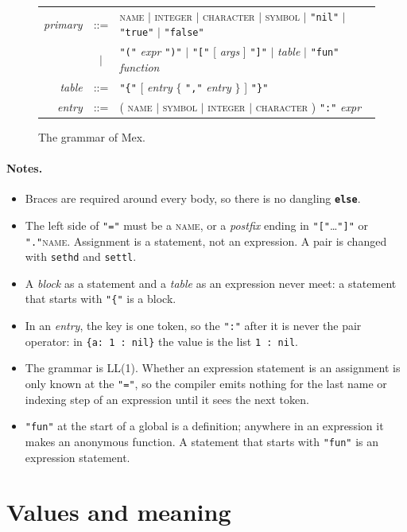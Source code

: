 \documentclass[11pt,a4paper]{article}
\newcommand{\lang}{Mex}
\newcommand{\kw}[1]{\textbf{\texttt{#1}}}
\newcommand{\nt}[1]{\textit{#1}}
\newcommand{\tok}[1]{\texttt{"#1"}}
\begin{document}
\begin{figure}[t]
\begin{tabular}{@{}r@{\quad}c@{\quad}l@{}}
\nt{primary}  & ::= & \textsc{name} $\mid$ \textsc{integer} $\mid$ \textsc{character} $\mid$ \textsc{symbol}
                $\mid$ \tok{nil} $\mid$ \tok{true} $\mid$ \tok{false}\\
              & $\mid$ & \tok{(} \nt{expr} \tok{)} $\mid$ \tok{[} [ \nt{args} ] \tok{]}
                $\mid$ \nt{table} $\mid$ \tok{fun} \nt{function}\\
\nt{table}    & ::= & \tok{\{} [ \nt{entry} $\{$ \tok{,} \nt{entry} $\}$ ] \tok{\}}\\
\nt{entry}    & ::= & ( \textsc{name} $\mid$ \textsc{symbol} $\mid$ \textsc{integer} $\mid$ \textsc{character} ) \tok{:} \nt{expr}\\
\end{tabular}
\caption{The grammar of \lang.}
\label{fig:grammar}
\end{figure}

\paragraph{Notes.}
\begin{itemize}[nosep]
\item Braces are required around every body, so there is no dangling
  \kw{else}.
\item The left side of \tok{=} must be a \textsc{name}, or a
  \nt{postfix} ending in \tok{[}\ldots\tok{]} or \tok{.}\textsc{name}.
  Assignment is a statement, not an expression. A pair is changed with
  \texttt{sethd} and \texttt{settl}.
\item A \nt{block} as a statement and a \nt{table} as an expression never
  meet: a statement that starts with \tok{\{} is a block.
\item In an \nt{entry}, the key is one token, so the \tok{:} after it is
  never the pair operator: in \verb|{a: 1 : nil}| the value is the list
  \verb|1 : nil|.
\item The grammar is LL(1). Whether an expression statement is an assignment
  is only known at the \tok{=}, so the compiler emits nothing for the last
  name or indexing step of an expression until it sees the next token.
\item \tok{fun} at the start of a global is a definition; anywhere in an
  expression it makes an anonymous function. A statement that starts with
  \tok{fun} is an expression statement.
\end{itemize}

\section{Values and meaning}\label{sec:values}
\end{document}

